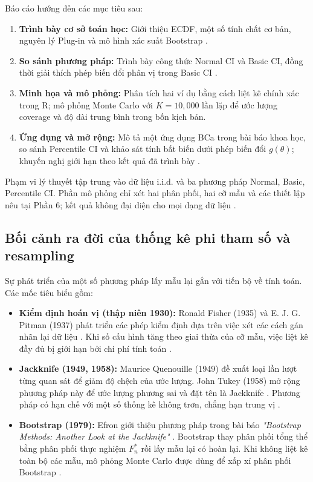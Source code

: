 	Báo cáo hướng đến các mục tiêu sau:
	\begin{enumerate}
		\item \textbf{Trình bày cơ sở toán học:} Giới thiệu ECDF, một số tính chất cơ bản, nguyên lý Plug-in và mô hình xác suất Bootstrap \cite{efron1993}.
		\item \textbf{So sánh phương pháp:} Trình bày công thức Normal CI và Basic CI, đồng thời giải thích phép biến đổi phân vị trong Basic CI \cite{davison1997}.
		\item \textbf{Minh họa và mô phỏng:} Phân tích hai ví dụ bằng cách liệt kê chính xác trong R; mô phỏng Monte Carlo với $K=10{,}000$ lần lặp để ước lượng coverage và độ dài trung bình trong bốn kịch bản.
		\item \textbf{Ứng dụng và mở rộng:} Mô tả một ứng dụng BCa trong bài báo khoa học, so sánh Percentile CI và khảo sát tính bất biến dưới phép biến đổi $g(\theta)$; khuyến nghị giới hạn theo kết quả đã trình bày \cite{deng2013, efron1993}.
	\end{enumerate}
	
	Phạm vi lý thuyết tập trung vào dữ liệu i.i.d. và ba phương pháp Normal, Basic, Percentile CI. Phần mô phỏng chỉ xét hai phân phối, hai cỡ mẫu và các thiết lập nêu tại Phần 6; kết quả không đại diện cho mọi dạng dữ liệu \cite{davison1997}.
	
	\subsection{Bối cảnh ra đời của thống kê phi tham số và resampling}
	Sự phát triển của một số phương pháp lấy mẫu lại gắn với tiến bộ về tính toán. Các mốc tiêu biểu gồm:
	\begin{itemize}
		\item \textbf{Kiểm định hoán vị (thập niên 1930):} Ronald Fisher (1935) và E. J. G. Pitman (1937) phát triển các phép kiểm định dựa trên việc xét các cách gán nhãn lại dữ liệu \cite{efron1993}. Khi số cấu hình tăng theo giai thừa của cỡ mẫu, việc liệt kê đầy đủ bị giới hạn bởi chi phí tính toán \cite{efron1979}.
		\item \textbf{Jackknife (1949, 1958):} Maurice Quenouille (1949) đề xuất loại lần lượt từng quan sát để giảm độ chệch của ước lượng. John Tukey (1958) mở rộng phương pháp này để ước lượng phương sai và đặt tên là Jackknife \cite{efron1979}. Phương pháp có hạn chế với một số thống kê không trơn, chẳng hạn trung vị \cite{efron1993}.
		\item \textbf{Bootstrap (1979):} Efron giới thiệu phương pháp trong bài báo \textit{"Bootstrap Methods: Another Look at the Jackknife"} \cite{efron1979}. Bootstrap thay phân phối tổng thể bằng phân phối thực nghiệm $F_n^*$ rồi lấy mẫu lại có hoàn lại. Khi không liệt kê toàn bộ các mẫu, mô phỏng Monte Carlo được dùng để xấp xỉ phân phối Bootstrap \cite{efron1993}.
	\end{itemize}
	
	
